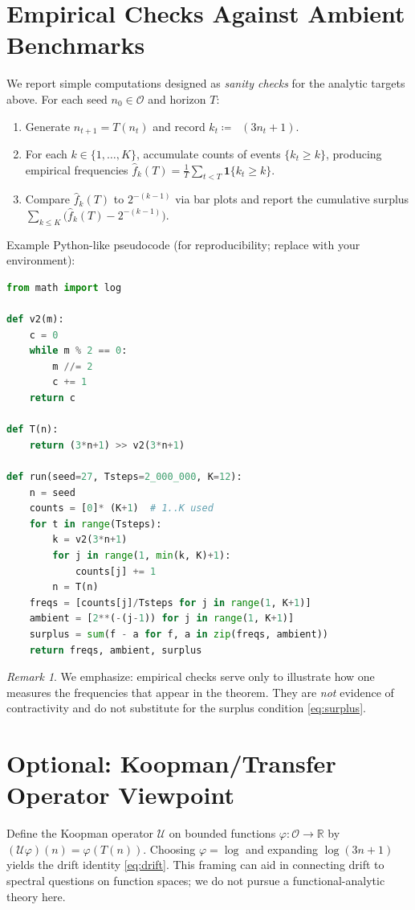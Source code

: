\documentclass[11pt]{article}
\theoremstyle{plain}
\theoremstyle{definition}
\theoremstyle{remark}
\newtheorem{remark}[theorem]{Remark}
\DeclareMathOperator{\vtwo}{v_2}
\newcommand{\Odd}{\mathcal{O}} %
\newcommand{\Todd}{T} %
\newcommand{\1}{\mathbf{1}}
\begin{document}
\section{Empirical Checks Against Ambient Benchmarks}
We report simple computations designed as \emph{sanity checks} for the analytic targets above. For each seed $n_0\in\Odd$ and horizon $T$:
\begin{enumerate}[label=\arabic*.]
  \item Generate $n_{t+1}=\Todd(n_t)$ and record $k_t\coloneqq \vtwo(3n_t+1)$.
  \item For each $k\in\{1,\dots,K\}$, accumulate counts of events $\{k_t\ge k\}$, producing empirical frequencies $\hat f_k(T)=\frac{1}{T}\sum_{t<T}\1\{k_t\ge k\}$.
  \item Compare $\hat f_k(T)$ to $2^{-(k-1)}$ via bar plots and report the cumulative surplus $\sum_{k\le K}\bigl(\hat f_k(T)-2^{-(k-1)}\bigr)$.
\end{enumerate}
\noindent Example Python-like pseudocode (for reproducibility; replace with your environment):
\begin{lstlisting}[language=Python]
from math import log

def v2(m):
    c = 0
    while m % 2 == 0:
        m //= 2
        c += 1
    return c

def T(n):
    return (3*n+1) >> v2(3*n+1)

def run(seed=27, Tsteps=2_000_000, K=12):
    n = seed
    counts = [0]* (K+1)  # 1..K used
    for t in range(Tsteps):
        k = v2(3*n+1)
        for j in range(1, min(k, K)+1):
            counts[j] += 1
        n = T(n)
    freqs = [counts[j]/Tsteps for j in range(1, K+1)]
    ambient = [2**(-(j-1)) for j in range(1, K+1)]
    surplus = sum(f - a for f, a in zip(freqs, ambient))
    return freqs, ambient, surplus
\end{lstlisting}
\begin{remark}
We emphasize: empirical checks serve only to illustrate how one measures the frequencies that appear in the theorem. They are \emph{not} evidence of contractivity and do not substitute for the surplus condition \eqref{eq:surplus}.
\end{remark}

\section{Optional: Koopman/Transfer Operator Viewpoint}
Define the Koopman operator $\mathcal{U}$ on bounded functions $\varphi:\Odd\to\mathbb{R}$ by $(\mathcal{U}\varphi)(n)=\varphi(\Todd(n))$. Choosing $\varphi=\log$ and expanding $\log(3n+1)$ yields the drift identity \eqref{eq:drift}. This framing can aid in connecting drift to spectral questions on function spaces; we do not pursue a functional-analytic theory here.
\end{document}
